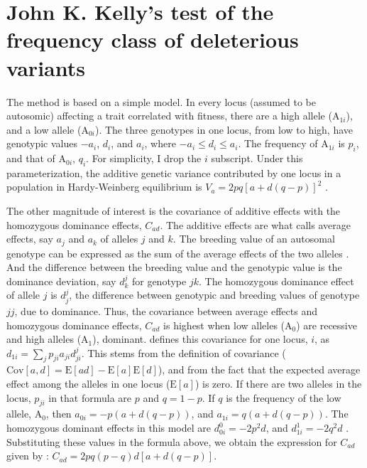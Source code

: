 \documentclass[a4paper,12pt]{article}
\begin{document}
\section{John K. Kelly's test of the frequency class of deleterious variants}\label{sec:autosomic}
The method is based on a simple model. In every locus (assumed to be autosomic) affecting a trait correlated with fitness, there are a high allele (A$_{1i}$), and a low allele (A$_{0i}$). The three genotypes in one locus, from low to high, have genotypic values $-a_i$, $d_i$, and $a_i$, where $-a_i \leqslant d_i \leqslant a_i$. The frequency of A$_{1i}$ is $p_i$, and that of A$_{0i}$, $q_i$. For simplicity, I drop the $i$ subscript. Under this parameterization, the additive genetic variance contributed by one locus in a population in Hardy-Weinberg equilibrium is $V_a=2pq[a+d(q-p)]^2$ \citet[p. 126]{Falconer1989}.

The other magnitude of interest is the covariance of additive effects with the homozygous dominance effects, $C_{ad}$. The additive effects are what \citet[p. 112]{Falconer1989} calls average effects, say $a_j$ and $a_k$ of alleles $j$ and $k$. The breeding value of an autosomal genotype can be expressed as the sum of the average effects of the two alleles \citep[p.115]{Falconer1989}. And the difference between the breeding value and the genotypic value is the dominance deviation, say $d^j_k$ for genotype $jk$. The homozygous dominance effect of allele $j$ is $d^j_j$, the difference between genotypic and breeding values of genotype $jj$, due to dominance. Thus, the covariance between average effects and homozygous dominance effects, $C_{ad}$ is highest when low alleles (A$_0$) are recessive and high alleles (A$_1$), dominant. \citet{Cockerham1984} defines this covariance for one locus, $i$, as $d_{1i}=\sum_j p_{ji}a_{ji}d^j_{ji}$. This stems from the definition of covariance ($\mathrm{Cov}[a, d]=\mathrm{E}[ad] - \mathrm{E}[a]\mathrm{E}[d]$), and from the fact that the expected average effect among the alleles in one locus ($\mathrm{E}[a]$) is zero. If there are two alleles in the locus, $p_{ji}$ in that formula are $p$ and $q = 1-p$. If $q$ is the frequency of the low allele, A$_0$, then $a_{0i} = -p(a+d(q-p))$, and $a_{1i} = q(a+d(q-p))$. The homozygous dominant effects in this model are $d^0_{0i} = -2p^2d$, and $d^1_{1i}=-2q^2d$ \citep[p. 118]{Falconer1989}. Substituting these values in the formula above, we obtain the expression for $C_{ad}$ given by \citet{Kelly1999}: $C_{ad}=2pq(p-q)d[a+d(q-p)]$.
\end{document}
